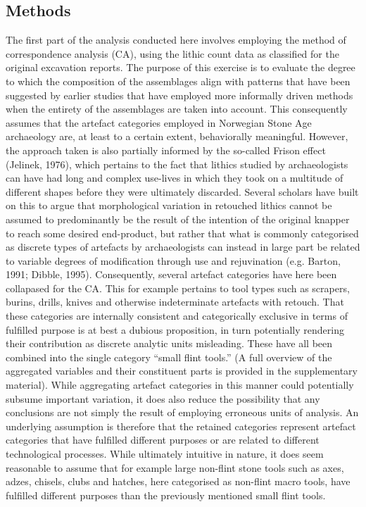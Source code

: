 \documentclass[
]{article}
\begin{document}
\hypertarget{methods}{%
\subsection{Methods}\label{methods}}

The first part of the analysis conducted here involves employing the method of correspondence analysis (CA), using the lithic count data as classified for the original excavation reports. The purpose of this exercise is to evaluate the degree to which the composition of the assemblages align with patterns that have been suggested by earlier studies that have employed more informally driven methods when the entirety of the assemblages are taken into account. This consequently assumes that the artefact categories employed in Norwegian Stone Age archaeology are, at least to a certain extent, behaviorally meaningful. However, the approach taken is also partially informed by the so-called Frison effect (Jelinek, 1976), which pertains to the fact that lithics studied by archaeologists can have had long and complex use-lives in which they took on a multitude of different shapes before they were ultimately discarded. Several scholars have built on this to argue that morphological variation in retouched lithics cannot be assumed to predominantly be the result of the intention of the original knapper to reach some desired end-product, but rather that what is commonly categorised as discrete types of artefacts by archaeologists can instead in large part be related to variable degrees of modification through use and rejuvination (e.g. Barton, 1991; Dibble, 1995). Consequently, several artefact categories have here been collapased for the CA. This for example pertains to tool types such as scrapers, burins, drills, knives and otherwise indeterminate artefacts with retouch. That these categories are internally consistent and categorically exclusive in terms of fulfilled purpose is at best a dubious proposition, in turn potentially rendering their contribution as discrete analytic units misleading. These have all been combined into the single category ``small flint tools.'' (A full overview of the aggregated variables and their constituent parts is provided in the supplementary material). While aggregating artefact categories in this manner could potentially subsume important variation, it does also reduce the possibility that any conclusions are not simply the result of employing erroneous units of analysis. An underlying assumption is therefore that the retained categories represent artefact categories that have fulfilled different purposes or are related to different technological processes. While ultimately intuitive in nature, it does seem reasonable to assume that for example large non-flint stone tools such as axes, adzes, chisels, clubs and hatches, here categorised as non-flint macro tools, have fulfilled different purposes than the previously mentioned small flint tools.
\end{document}
